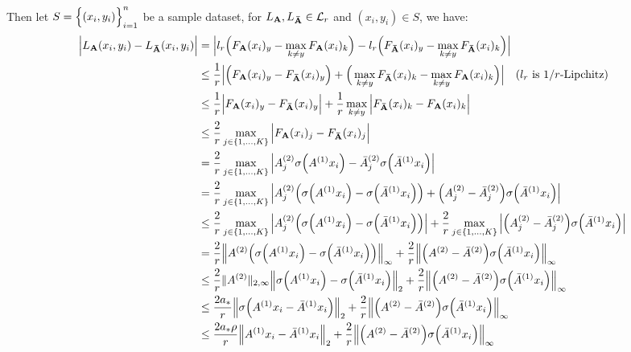 \noindent Then let $S=\Big\{ (x_i, y_i) \Big\}_{i=1}^n$ be a sample dataset, for $L_{\bf A}, L_{\bf \bar A}\in\mathcal{L}_r$ and $(x_i, y_i)\in S$, we have:
\begin{align*}
    \Big| L_{\bf A}(x_i, y_i) - L_{\bf \bar A}(x_i, y_i) \Big| &= \Big| 
        l_r\Big( 
            F_{\bf A}(x_i)_y - \max_{k\ne y} F_{\bf A}(x_i)_k
         \Big) - 
        l_r\Big( 
            F_{\bf \bar A}(x_i)_y - \max_{k\ne y} F_{\bf \bar A}(x_i)_k
         \Big)
     \Big| \\
    &\le \frac{1}{r} \Big| 
        \Big( F_{\bf A}(x_i)_y - F_{\bf \bar A}(x_i)_y \Big) +
        \Big( 
            \max_{k\ne y} F_{\bf \bar A}(x_i)_k - \max_{k\ne y} F_{\bf A}(x_i)_k
         \Big)
     \Big| \ \ \ \text{($l_r$ is $1/r$-Lipchitz)} \\
    &\le \frac{1}{r} \Big| 
        F_{\bf A}(x_i)_y - F_{\bf \bar A}(x_i)_y
     \Big| + \frac{1}{r}\max_{k\ne y}\Big| 
        F_{\bf \bar A}(x_i)_k - F_{\bf A}(x_i)_k
     \Big| \\
    &\le \frac{2}{r}\max_{j\in\{1, \dots, K\}} \Big| F_{\bf A}(x_i)_j - F_{\bf \bar A}(x_i)_j \Big| \\
    &= \frac{2}{r}\max_{j\in\{1, \dots, K\}} \Big| 
        A^{(2)}_j\sigma\Big( A^{(1)}x_i \Big) - \bar A^{(2)}_j\sigma\Big( \bar A^{(1)}x_i \Big)
     \Big| \\
    &= \frac{2}{r}\max_{j\in\{1, \dots, K\}} \Big| 
        A_j^{(2)}\Big( \sigma\Big( A^{(1)}x_i \Big) - \sigma\Big( \bar A^{(1)}x_i \Big) \Big)
        + \Big( A_j^{(2)} - \bar A_j^{(2)} \Big)\sigma\Big( \bar A^{(1)}x_i \Big) 
     \Big| \\
    &\le \frac{2}{r}\max_{j\in\{1, \dots, K\}}\Big| 
        A_j^{(2)}\Big( \sigma\Big( A^{(1)}x_i \Big) - \sigma\Big( \bar A^{(1)}x_i \Big) \Big)
     \Big| + \frac{2}{r}\max_{j\in\{1, \dots, K\}}\Big| 
        \Big( A_j^{(2)} - \bar A_j^{(2)} \Big)\sigma\Big( \bar A^{(1)}x_i \Big) 
     \Big| \\
    &= \frac{2}{r}\Big\| 
        A^{(2)}\Big( \sigma\Big( A^{(1)}x_i \Big) - \sigma\Big( \bar A^{(1)}x_i \Big) \Big)
    \Big\|_\infty + 
    \frac{2}{r}\Big\|
        \Big( A^{(2)} - \bar A^{(2)} \Big)\sigma\Big( \bar A^{(1)}x_i \Big) 
    \Big\|_\infty \\
    &\le \frac{2}{r} \|A^{(2)}\|_{2,\infty} \Big\| \sigma\Big( A^{(1)}x_i \Big) - \sigma\Big( \bar A^{(1)}x_i \Big) \Big\|_2  + \frac{2}{r} \Big\| \Big( A^{(2)} - \bar A^{(2)} \Big)\sigma\Big( \bar A^{(1)}x_i \Big) \Big\|_\infty \\
    &\le \frac{2a_*}{r} \Big\| \sigma\Big( A^{(1)}x_i - \bar A^{(1)}x_i \Big)\Big\|_2 + \frac{2}{r} \Big\| \Big( A^{(2)} - \bar A^{(2)} \Big)\sigma\Big( \bar A^{(1)}x_i \Big) \Big\|_\infty \\
    &\le \frac{2a_*\rho}{r} \Big\| A^{(1)}x_i - \bar A^{(1)}x_i \Big\|_2 + \frac{2}{r} \Big\| \Big( A^{(2)} - \bar A^{(2)} \Big)\sigma\Big( \bar A^{(1)}x_i \Big) \Big\|_\infty \\
\end{align*}

